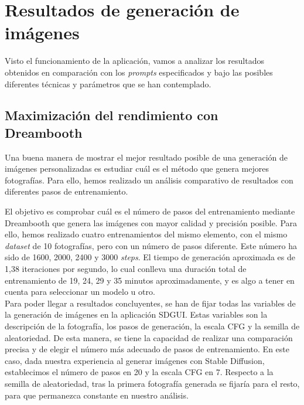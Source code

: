 \section{Resultados de generación de imágenes}

Visto el funcionamiento de la aplicación, vamos a analizar los resultados obtenidos en comparación con los \textit{prompts} especificados y bajo las posibles diferentes técnicas y parámetros que se han contemplado.


\subsection{Maximización del rendimiento con Dreambooth}

Una buena manera de mostrar el mejor resultado posible de una generación de imágenes personalizadas es estudiar cuál es el método que genera mejores fotografías. Para ello, hemos realizado un análisis comparativo de resultados con diferentes pasos de entrenamiento.

El objetivo es comprobar cuál es el número de pasos del entrenamiento mediante Dreambooth que genera las imágenes con mayor calidad y precisión posible. Para ello, hemos realizado cuatro entrenamientos del mismo elemento, con el mismo \textit{dataset} de 10 fotografías, pero con un número de pasos diferente. Este número ha sido de 1600, 2000, 2400 y 3000 \textit{steps}. El tiempo de generación aproximada es de 1,38 iteraciones por segundo, lo cual conlleva una duración total de entrenamiento de 19, 24, 29 y 35 minutos aproximadamente, y es algo a tener en cuenta para seleccionar un modelo u otro.\\

Para poder llegar a resultados concluyentes, se han de fijar todas las variables de la generación de imágenes en la aplicación SDGUI. Estas variables son la descripción de la fotografía, los pasos de generación, la escala CFG y la semilla de aleatoriedad. De esta manera, se tiene la capacidad de realizar una comparación precisa y de elegir el número más adecuado de pasos de entrenamiento. En este caso, dada nuestra experiencia al generar imágenes con Stable Diffusion, establecimos el número de pasos en 20 y la escala CFG en 7. Respecto a la semilla de aleatoriedad, tras la primera fotografía generada se fijaría para el resto, para que permanezca constante en nuestro análisis.\\

